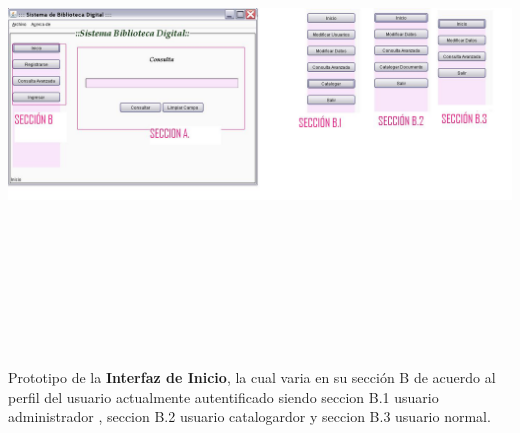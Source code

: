 \begin{minipage}{1\textwidth}
	\begin{center}
	\includegraphics[width= 20cm , height= 13cm,angle=90]{prototiposGui/guiPpal}
	\end{center}
	{Prototipo de la {\bf Interfaz de Inicio}, la cual varia en su sección B de acuerdo al perfil
	del usuario actualmente autentificado siendo seccion B.1 usuario administrador  , seccion B.2
	usuario catalogardor y seccion B.3 usuario normal.}
\end{minipage}\\[1cm]



